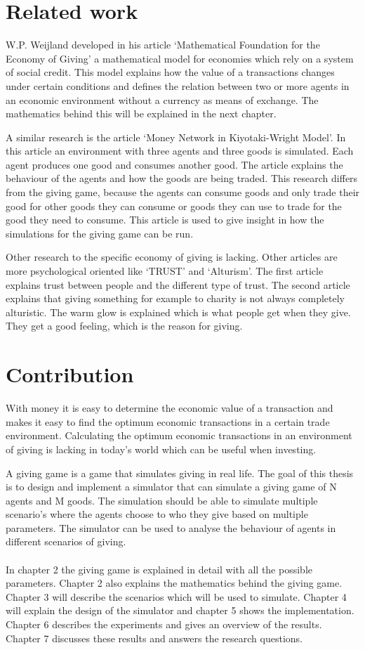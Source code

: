 \documentclass[twoside,openright]{uva-bachelor-thesis}
\begin{document}
\section{Related work}
W.P. Weijland developed in his article ‘Mathematical Foundation for the Economy of Giving’ a mathematical model for economies which rely on a system of social credit. This model  explains how the value of a transactions changes under certain conditions and defines the relation between two or more agents in an economic environment without a currency as means of exchange. The mathematics behind this will be explained in the next chapter.

A similar research is the article ‘Money Network in Kiyotaki-Wright Model’. In this article an environment with three agents and three goods is simulated. Each agent produces one good and consumes another good. The article explains the behaviour of the agents and how the goods are being traded. This research differs from the giving game, because the agents can consume goods and only trade their good for other goods they can consume or goods they can use to trade for the good they need to consume. This article is used to give insight in how the simulations for the giving game can be run.

Other research to the specific economy of giving is lacking. Other articles are more psychological oriented like ‘TRUST’ and ‘Alturism’. The first article explains trust between people and the different type of trust. The second article explains that giving something for example to charity is not always completely alturistic. The warm glow is explained which is what people get when they give. They get a good feeling, which is the reason for giving.


\section{Contribution}
With money it is easy to determine the economic value of a transaction and makes it easy to find the optimum economic transactions in a certain trade environment. Calculating the optimum economic transactions in an environment of giving is lacking in today’s world which can be useful when investing.

A giving game is a game that simulates giving in real life. The goal of this thesis is to design and implement a simulator that can simulate a giving game of N agents and M goods. The simulation should be able to simulate multiple scenario’s where the agents choose to who they give based on multiple parameters. The simulator can be used to analyse the behaviour of agents in different scenarios of giving.
\\
\\
In chapter 2 the giving game is explained in detail with all the possible parameters. Chapter 2 also explains the mathematics behind the giving game. Chapter 3 will describe the scenarios which will be used to simulate. Chapter 4 will explain the design of the simulator and chapter 5 shows the implementation. Chapter 6 describes the experiments and gives an overview of the results. Chapter 7 discusses these results and answers the research questions.
\end{document}
